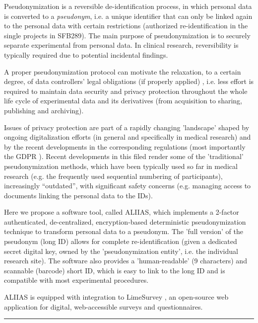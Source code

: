 Pseudonymization is a reversible de-identification process, in which personal data is converted to a \emph{pseudonym}, i.e. a unique identifier that can only be linked again to the personal data with certain restrictions (authorized re-identification in the single projects in SFB289). The main purpose of pseudonymization is to securely separate experimental from personal data. In clinical research, reversibility is typically required due to potential incidental findings.

A proper pseudonymization protocol can motivate the relaxation, to a certain degree, of data controllers’ legal obligations (if properly applied) \cite{pseudonym}, i.e. less effort is required to maintain data security and privacy protection throughout the whole life cycle of experimental data and its derivatives (from acquisition to sharing, publishing and archiving).

Issues of privacy protection are part of a rapidly changing 'landscape' shaped by ongoing digitalization efforts (in general and specifically in medical research) and by the recent developments in the corresponding regulations (most importantly the GDPR \cite{gdpr}). Recent developments in  this filed render some of the 'traditional' pseudonymization methods, which have been typically used so far in medical research (e.g. the frequently used sequential numbering of participants), increasingly “outdated”, with significant safety concerns (e.g. managing access to documents linking the personal data to the IDs).

Here we propose a software tool, called ALIIAS, which implements a 2-factor authenticated, de-centralized, encryption-based deterministic pseudonymization technique to transform personal data to a pseudonym.
The 'full version' of the pseudonym (long ID) allows for complete re-identification (given a dedicated secret digital key, owned by the 'pseudonymization entity', i.e. the individual research site). The software also provides a 'human-readable' (9 characters) and scannable (barcode)  short ID, which is easy to link to the long ID and is compatible with most experimental procedures.

ALIIAS is equipped with integration to LimeSurvey \cite{limesurvey}, an open-source web application for digital, web-accessible surveys and questionnaires.

\par\noindent\rule{\textwidth\color{pniblue}}{0.4pt}

